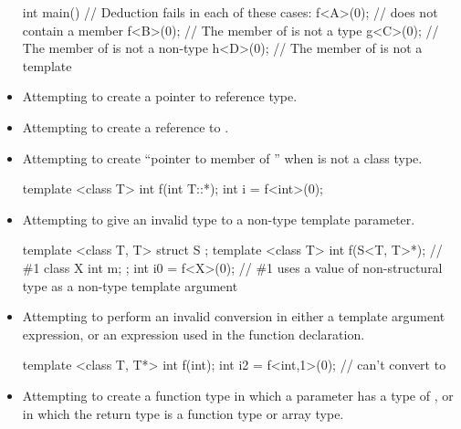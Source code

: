 \begin{note}
\begin{itemize}
\begin{example}
\begin{codeblock}
int main() {
  // Deduction fails in each of these cases:
  f<A>(0);          //  does not contain a member 
  f<B>(0);          // The  member of  is not a type
  g<C>(0);          // The  member of  is not a non-type
  h<D>(0);          // The  member of  is not a template
}
\end{codeblock}
\end{example}
\item
Attempting to create a pointer to reference type.
\item
Attempting to create a reference to .
\item
Attempting to create ``pointer to member of '' when  is not a
class type.
\begin{example}
\begin{codeblock}
template <class T> int f(int T::*);
int i = f<int>(0);
\end{codeblock}
\end{example}
\item
Attempting to give an invalid type to a non-type template parameter.
\begin{example}
\begin{codeblock}
template <class T, T> struct S {};
template <class T> int f(S<T, T{}>*);   // \#1
class X {
  int m;
};
int i0 = f<X>(0);   // \#1 uses a value of non-structural type  as a non-type template argument
\end{codeblock}
\end{example}

\item
Attempting to perform an invalid conversion in either a template
argument expression, or an expression used in the function
declaration.
\begin{example}
\begin{codeblock}
template <class T, T*> int f(int);
int i2 = f<int,1>(0);           // can't convert  to 
\end{codeblock}
\end{example}

\item
Attempting to create a function type in which a parameter has a type
of , or in which the return type is a function type
or array type.
\end{itemize}
\end{note}

